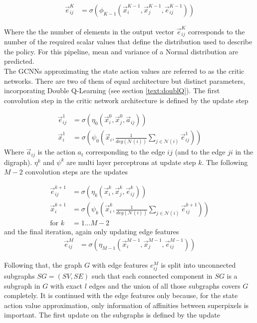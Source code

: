 \begin{align}
\vec{e}_{ij}^{K} &= \sigma \left( \phi_{K-1} \left(\vec{x}_i^{K-1}, \vec{x}_j^{K-1}, \vec{e}_{ij}^{K-1} \right)\right)
\end{align}

Where the the number of elements in the output vector $\vec{e}_{ij}^K$ corresponds to the number of the required scalar values that define the distribution used to describe the policy. For this pipeline, mean and variance of a Normal distribution are predicted.\\

The GCNNs approximating the state action values are referred to as the critic networks. There are two of them of equal architecture but distinct parameters, incorporating Double Q-Learning (see section \ref{text:doublQ}). The first convolution step in the critic network architecture is defined by the update step

\begin{align}
\vec{e}_{ij}^1 &= \sigma \left( \eta_0 \left(\vec{x}_i^0, \vec{x}_j^0, \vec{a}_{ij} \right)\right)\\
\vec{x}_i^1 &= \sigma \left( \psi_0 \left(\vec{x}_i, \frac{1}{deg(\mathcal{N}(i))} \sum_{j \in \mathcal{N}(i)}  \vec{e}_{ij}^1 \right)\right)
\end{align}
Where $\vec{a}_{ij}$ is the action $a_t$ corresponding to the edge $ij$ (and to the edge $ji$ in the digraph). $\eta^k$ and $\psi^k$
are multi layer perceptrons at update step $k$.
The following $M-2$ convolution steps are the updates

\begin{align}
\vec{e}_{ij}^{k+1} &= \sigma \left( \eta_k \left(\vec{x}_i^k, \vec{x}_j^k, \vec{e}_{ij}^k \right)\right)\\
\vec{x}_i^{k+1} &= \sigma \left( \psi_k \left(\vec{x}_i^k, \frac{1}{deg(\mathcal{N}(i))} \sum_{j \in \mathcal{N}(i)}  \vec{e}_{ij}^{k+1} \right)\right)\\
\text{for }k&=1...M-2
\end{align}
and the final iteration, again only updating edge features
\begin{align}
\vec{e}_{ij}^M &= \sigma \left( \eta_{M-1} \left(\vec{x}_i^{M-1}, \vec{x}_j^{M-1}, \vec{e}_{ij}^{M-1} \right)\right)
\end{align}

Following that, the graph $G$ with edge features $e_{ij}^M$ is split into unconnected subgraphs $SG=(SV,SE)$ such that each connected component in $SG$ is a subgraph in $G$ with exact $l$ edges and the union of all those subgraphs covers $G$ completely. It is continued with the edge features only because, for the state action value approximation, only information of affinities between superpixels is important. The first update on the subgraphs is defined by the update

